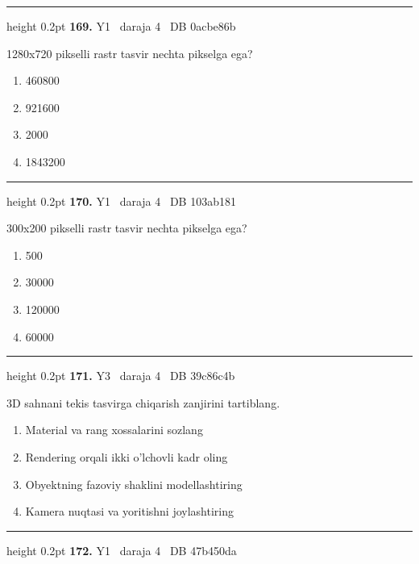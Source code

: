 \documentclass[10pt,a4paper,oneside]{article}
\begin{document}
\vspace{2mm}\hrule height 0.2pt \vspace{4mm}
\hypertarget{q169}{\textbf{\color{ink}169.}}  {\color{muted}\scriptsize Y1 \textbullet\ daraja 4 \textbullet\ DB 0acbe86b}
\par
1280x720 pikselli rastr tasvir nechta pikselga ega?
\begin{enumerate}[label=\Alph*),leftmargin=9mm]
\item 460800
\item 921600
\item 2000
\item 1843200
\end{enumerate}
\vspace{2mm}\hrule height 0.2pt \vspace{4mm}
\hypertarget{q170}{\textbf{\color{ink}170.}}  {\color{muted}\scriptsize Y1 \textbullet\ daraja 4 \textbullet\ DB 103ab181}
\par
300x200 pikselli rastr tasvir nechta pikselga ega?
\begin{enumerate}[label=\Alph*),leftmargin=9mm]
\item 500
\item 30000
\item 120000
\item 60000
\end{enumerate}
\vspace{2mm}\hrule height 0.2pt \vspace{4mm}
\hypertarget{q171}{\textbf{\color{ink}171.}}  {\color{muted}\scriptsize Y3 \textbullet\ daraja 4 \textbullet\ DB 39c86c4b}
\par
3D sahnani tekis tasvirga chiqarish zanjirini tartiblang.
\begin{enumerate}[label=\Alph*),leftmargin=9mm]
\item Material va rang xossalarini sozlang
\item Rendering orqali ikki o'lchovli kadr oling
\item Obyektning fazoviy shaklini modellashtiring
\item Kamera nuqtasi va yoritishni joylashtiring
\end{enumerate}
\vspace{2mm}\hrule height 0.2pt \vspace{4mm}
\hypertarget{q172}{\textbf{\color{ink}172.}}  {\color{muted}\scriptsize Y1 \textbullet\ daraja 4 \textbullet\ DB 47b450da}
\par
\end{document}
